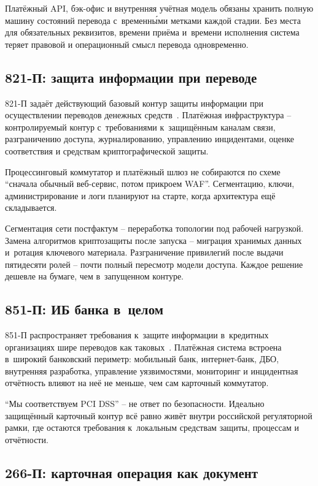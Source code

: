 Платёжный API, бэк-офис и внутренняя учётная модель обязаны хранить полную машину состояний перевода с~временн\'{ы}ми метками каждой стадии. Без места для обязательных реквизитов, времени приёма и~времени исполнения система теряет правовой и операционный смысл перевода одновременно.

\subsection*{821-П: защита информации при переводе}

821-П задаёт действующий базовый контур защиты информации при осуществлении переводов денежных средств~\cite{cbr-821p}. Платёжная инфраструктура -- контролируемый контур с~требованиями к~защищённым каналам связи, разграничению доступа, журналированию, управлению инцидентами, оценке соответствия и средствам криптографической защиты.

Процессинговый коммутатор и платёжный шлюз не собираются по схеме \enquote{сначала обычный веб-сервис, потом прикроем WAF}. Сегментацию, ключи, администрирование и логи планируют на старте, когда архитектура ещё складывается.

Сегментация сети постфактум -- переработка топологии под рабочей нагрузкой. Замена алгоритмов криптозащиты после запуска -- миграция хранимых данных и~ротация ключевого материала. Разграничение привилегий после выдачи пятидесяти ролей -- почти полный пересмотр модели доступа. Каждое решение дешевле на бумаге, чем в~запущенном контуре.

\subsection*{851-П: ИБ банка в~целом}

851-П распространяет требования к~защите информации в~кредитных организациях шире переводов как таковых~\cite{cbr-851p}. Платёжная система встроена в~широкий банковский периметр: мобильный банк, интернет-банк, ДБО, внутренняя разработка, управление уязвимостями, мониторинг и инцидентная отчётность влияют на неё не меньше, чем сам карточный коммутатор.

\enquote{Мы соответствуем PCI DSS} -- не ответ по безопасности. Идеально защищённый карточный контур всё равно живёт внутри российской регуляторной рамки, где остаются требования к~локальным средствам защиты, процессам и отчётности.

\subsection*{266-П: карточная операция как документ}

